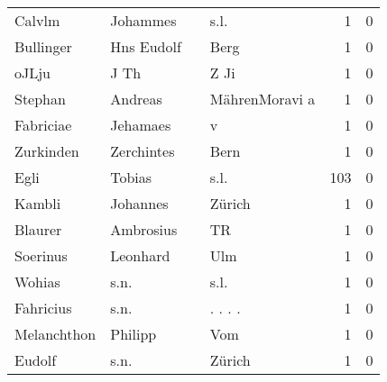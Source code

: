 \begin{center}
\begin{tiny}
\begin{longtabu}{llllrr}
                   Calvlm &                           Johammes &             &                                        s.l. &          1 &         0 \\
                Bullinger &                         Hns Eudolf &             &                                        Berg &          1 &         0 \\
                    oJLju &                               J Th &             &                                        Z Ji &          1 &         0 \\
                  Stephan &                            Andreas &             &                              MährenMoravi a &          1 &         0 \\
                Fabriciae &                           Jehamaes &             &                                           v &          1 &         0 \\
                Zurkinden &                         Zerchintes &             &                                        Bern &          1 &         0 \\
                     Egli &                             Tobias &             &                                        s.l. &        103 &         0 \\
                   Kambli &                           Johannes &             &                                      Zürich &          1 &         0 \\
                  Blaurer &                          Ambrosius &             &                                          TR &          1 &         0 \\
                 Soerinus &                           Leonhard &             &                                         Ulm &          1 &         0 \\
                   Wohias &                               s.n. &             &                                        s.l. &          1 &         0 \\
                Fahricius &                               s.n. &             &                                    . . . .  &          1 &         0 \\
              Melanchthon &                            Philipp &             &                                         Vom &          1 &         0 \\
                   Eudolf &                               s.n. &             &                                      Zürich &          1 &         0 \\

\end{longtabu}
\end{tiny}
\end{center}
